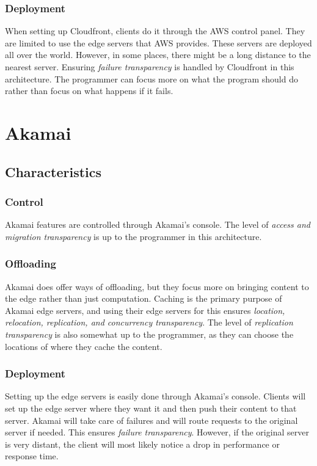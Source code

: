 \subsubsection{Deployment}
When setting up Cloudfront, clients do it through the AWS control panel. They are limited to use the edge servers that AWS provides. These servers are deployed all over the world. However, in some places, there might be a long distance to the nearest server. Ensuring \textit{failure transparency} is handled by Cloudfront in this architecture. The programmer can focus more on what the program should do rather than focus on what happens if it fails. 









\section{Akamai}
\subsection{Characteristics}
\subsubsection{Control}
Akamai features are controlled through Akamai's console. The level of \textit{access and migration transparency} is up to the programmer in this architecture.

\subsubsection{Offloading}
Akamai does offer ways of offloading, but they focus more on bringing content to the edge rather than just computation. Caching is the primary purpose of Akamai edge servers, and using their edge servers for this ensures \textit{location, relocation, replication, and concurrency transparency}. The level of \textit{replication transparency} is also somewhat up to the programmer, as they can choose the locations of where they cache the content.

\subsubsection{Deployment}
Setting up the edge servers is easily done through Akamai's console. Clients will set up the edge server where they want it and then push their content to that server. Akamai will take care of failures and will route requests to the original server if needed. This ensures \textit{failure transparency}. However, if the original server is very distant, the client will most likely notice a drop in performance or response time.



